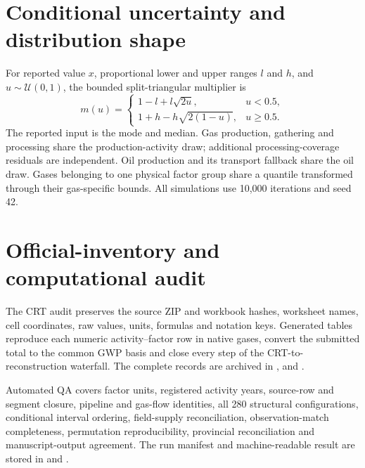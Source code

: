 \documentclass[3p,times,authoryear]{elsarticle}
\begin{document}
\section{Conditional uncertainty and distribution shape}

For reported value $x$, proportional lower and upper ranges $l$ and $h$, and
$u\sim\mathcal{U}(0,1)$, the bounded split-triangular multiplier is
\begin{equation}
m(u)=\begin{cases}
1-l+l\sqrt{2u}, & u<0.5,\\
1+h-h\sqrt{2(1-u)}, & u\geq0.5.
\end{cases}
\end{equation}
The reported input is the mode and median. Gas production, gathering and processing share the
production-activity draw; additional processing-coverage residuals are independent. Oil
production and its transport fallback share the oil draw. Gases belonging to one physical factor
group share a quantile transformed through their gas-specific bounds. All simulations use
10,000 iterations and seed 42.



\section{Official-inventory and computational audit}

The CRT audit preserves the source ZIP and workbook hashes, worksheet names, cell coordinates,
raw values, units, formulas and notation keys. Generated tables reproduce each numeric
activity--factor row in native gases, convert the submitted total to the common GWP basis and
close every step of the CRT-to-reconstruction waterfall. The complete records are archived in
,
 and
.

Automated QA covers factor units, registered activity years, source-row and segment closure,
pipeline and gas-flow identities, all 280 structural configurations, conditional interval
ordering, field-supply reconciliation, observation-match completeness, permutation
reproducibility, provincial reconciliation and manuscript-output agreement. The run manifest and
machine-readable result are stored in  and
.
\end{document}
